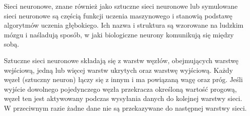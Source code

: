 \documentclass[a4paper,12pt,oneside]{book}
\begin{document}
						Sieci neuronowe, znane również jako sztuczne sieci neuronowe lub symulowane sieci neuronowe są częścią funkcji uczenia maszynowego i stanowią podstawę algorytmów uczenia głębokiego. Ich nazwa i struktura są wzorowane na ludzkim mózgu i naśladują sposób, w jaki biologiczne neurony komunikują się między sobą.
						
						Sztuczne sieci neuronowe składają się z warstw węzłów, obejmujących warstwę wejściową, jedną lub więcej warstw ukrytych oraz warstwę wyjściową. Każdy węzeł (sztuczny neuron) łączy się z innym i ma powiązaną wagę oraz próg. Jeśli wyjście dowolnego pojedynczego węzła przekracza określoną wartość progową, węzeł ten jest aktywowany podczas wysyłania danych do kolejnej warstwy sieci. W przeciwnym razie żadne dane nie są przekazywane do następnej warstwy sieci.
						
\end{document}
